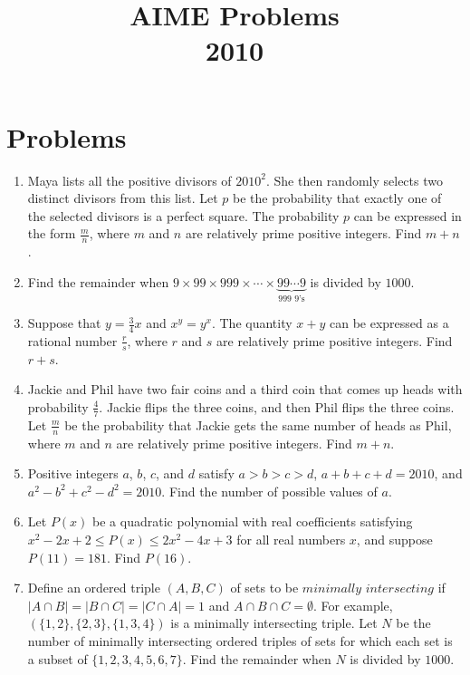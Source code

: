 \documentclass{article}
\title{AIME Problems \\ 2010}
\date{}
\begin{document}
\maketitle\thispagestyle{fancy}\newpage\section*{Problems}\begin{enumerate}[label=\arabic*., itemsep=0.5em]\item Maya lists all the positive divisors of $2010^2$. She then randomly selects two distinct divisors from this list. Let $p$ be the probability that exactly one of the selected divisors is a perfect square. The probability $p$ can be expressed in the form $\frac {m}{n}$, where $m$ and $n$ are relatively prime positive integers. Find $m + n$.\par \vspace{0.5em}\item Find the remainder when $9 \times 99 \times 999 \times \cdots \times \underbrace{99\cdots9}_{\text{999 9's}}$ is divided by $1000$.\par \vspace{0.5em}\item Suppose that $y = \frac34x$ and $x^y = y^x$. The quantity $x + y$ can be expressed as a rational number $\frac {r}{s}$, where $r$ and $s$ are relatively prime positive integers. Find $r + s$.\par \vspace{0.5em}\item Jackie and Phil have two fair coins and a third coin that comes up heads with probability $\frac47$. Jackie flips the three coins, and then Phil flips the three coins. Let $\frac {m}{n}$ be the probability that Jackie gets the same number of heads as Phil, where $m$ and $n$ are relatively prime positive integers. Find $m + n$.\par \vspace{0.5em}\item Positive integers $a$, $b$, $c$, and $d$ satisfy $a > b > c > d$, $a + b + c + d = 2010$, and $a^2 - b^2 + c^2 - d^2 = 2010$. Find the number of possible values of $a$.\par \vspace{0.5em}\item Let $P(x)$ be a quadratic polynomial with real coefficients satisfying $x^2 - 2x + 2 \le P(x) \le 2x^2 - 4x + 3$ for all real  numbers $x$, and suppose $P(11) = 181$. Find $P(16)$.\par \vspace{0.5em}\item Define an ordered triple $(A, B, C)$ of sets to be $\textit{minimally intersecting}$ if $|A \cap B| = |B \cap C| = |C \cap A| = 1$ and $A \cap B \cap C = \emptyset$. For example, $(\{1,2\},\{2,3\},\{1,3,4\})$ is a minimally intersecting triple. Let $N$ be the number of minimally intersecting ordered triples of sets for which each set is a subset of $\{1,2,3,4,5,6,7\}$. Find the remainder when $N$ is divided by $1000$.


\end{enumerate}
\end{document}
